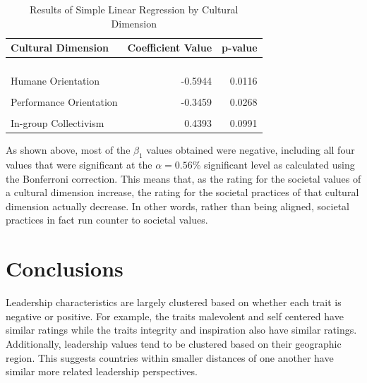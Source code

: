 \documentclass[
]{article}
\begin{document}
\begin{table}[!h]

\caption{\label{tab:SPV SLR Table}Results of Simple Linear Regression by Cultural Dimension}
\centering
\begin{tabular}[t]{lrr}
\toprule
Cultural Dimension & Coefficient Value & p-value\\
\midrule
\cellcolor[HTML]{E5F5E0}{Uncertainty Avoidance} & \cellcolor[HTML]{E5F5E0}{-0.6199} & \cellcolor[HTML]{E5F5E0}{0.0000}\\
\cellcolor[HTML]{E5F5E0}{Institutional Collectivism} & \cellcolor[HTML]{E5F5E0}{-0.5251} & \cellcolor[HTML]{E5F5E0}{0.0000}\\
\cellcolor[HTML]{E5F5E0}{Power Distance} & \cellcolor[HTML]{E5F5E0}{-0.4991} & \cellcolor[HTML]{E5F5E0}{0.0006}\\
\cellcolor[HTML]{E5F5E0}{Future Orientation} & \cellcolor[HTML]{E5F5E0}{-0.4725} & \cellcolor[HTML]{E5F5E0}{0.0009}\\
Humane Orientation & -0.5944 & 0.0116\\
\addlinespace
\cellcolor[HTML]{F0F0F0}{Gender Egalitarianism} & \cellcolor[HTML]{F0F0F0}{0.2437} & \cellcolor[HTML]{F0F0F0}{0.0124}\\
Performance Orientation & -0.3459 & 0.0268\\
\cellcolor[HTML]{F0F0F0}{Assertiveness} & \cellcolor[HTML]{F0F0F0}{-0.1507} & \cellcolor[HTML]{F0F0F0}{0.0414}\\
In-group Collectivism & 0.4393 & 0.0991\\
\bottomrule
\end{tabular}
\end{table}

As shown above, most of the \(\beta_1\) values obtained were negative,
including all four values that were significant at the
\(\alpha = 0.56\)\% significant level as calculated using the Bonferroni
correction. This means that, as the rating for the societal values of a
cultural dimension increase, the rating for the societal practices of
that cultural dimension actually decrease. In other words, rather than
being aligned, societal practices in fact run counter to societal
values.

\hypertarget{conclusions}{%
\section{Conclusions}\label{conclusions}}

Leadership characteristics are largely clustered based on whether each
trait is negative or positive. For example, the traits malevolent and
self centered have similar ratings while the traits integrity and
inspiration also have similar ratings. Additionally, leadership values
tend to be clustered based on their geographic region. This suggests
countries within smaller distances of one another have similar more
related leadership perspectives.
\end{document}

